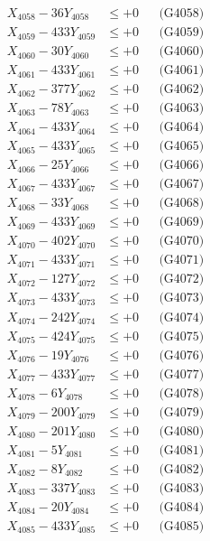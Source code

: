 \documentclass[a4paper,10pt]{article}
\begin{document}
{\begin{align}
X_{4058} - 36Y_{4058} &\leq +0 && \text{(G4058)} \\
X_{4059} - 433Y_{4059} &\leq +0 && \text{(G4059)} \\
X_{4060} - 30Y_{4060} &\leq +0 && \text{(G4060)} \\
\allowbreak
X_{4061} - 433Y_{4061} &\leq +0 && \text{(G4061)} \\
X_{4062} - 377Y_{4062} &\leq +0 && \text{(G4062)} \\
X_{4063} - 78Y_{4063} &\leq +0 && \text{(G4063)} \\
X_{4064} - 433Y_{4064} &\leq +0 && \text{(G4064)} \\
X_{4065} - 433Y_{4065} &\leq +0 && \text{(G4065)} \\
X_{4066} - 25Y_{4066} &\leq +0 && \text{(G4066)} \\
X_{4067} - 433Y_{4067} &\leq +0 && \text{(G4067)} \\
X_{4068} - 33Y_{4068} &\leq +0 && \text{(G4068)} \\
X_{4069} - 433Y_{4069} &\leq +0 && \text{(G4069)} \\
X_{4070} - 402Y_{4070} &\leq +0 && \text{(G4070)} \\
\allowbreak
X_{4071} - 433Y_{4071} &\leq +0 && \text{(G4071)} \\
X_{4072} - 127Y_{4072} &\leq +0 && \text{(G4072)} \\
X_{4073} - 433Y_{4073} &\leq +0 && \text{(G4073)} \\
X_{4074} - 242Y_{4074} &\leq +0 && \text{(G4074)} \\
X_{4075} - 424Y_{4075} &\leq +0 && \text{(G4075)} \\
X_{4076} - 19Y_{4076} &\leq +0 && \text{(G4076)} \\
X_{4077} - 433Y_{4077} &\leq +0 && \text{(G4077)} \\
X_{4078} - 6Y_{4078} &\leq +0 && \text{(G4078)} \\
X_{4079} - 200Y_{4079} &\leq +0 && \text{(G4079)} \\
X_{4080} - 201Y_{4080} &\leq +0 && \text{(G4080)} \\
\allowbreak
X_{4081} - 5Y_{4081} &\leq +0 && \text{(G4081)} \\
X_{4082} - 8Y_{4082} &\leq +0 && \text{(G4082)} \\
X_{4083} - 337Y_{4083} &\leq +0 && \text{(G4083)} \\
X_{4084} - 20Y_{4084} &\leq +0 && \text{(G4084)} \\
X_{4085} - 433Y_{4085} &\leq +0 && \text{(G4085)} \\

\end{align}}
\end{document}
